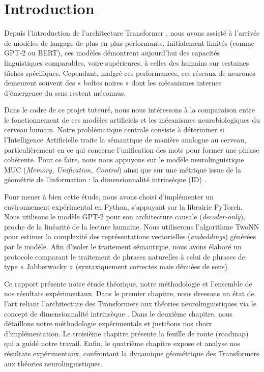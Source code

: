 \chapter*{Introduction}

Depuis l'introduction de l'architecture Transformer \cite{vaswani2017attention}, nous avons assisté à l'arrivée de modèles de langage de plus en plus performants. Initialement limités (comme GPT-2 ou BERT), ces modèles démontrent aujourd'hui des capacités linguistiques comparables, voire supérieures, à celles des humains sur certaines tâches spécifiques. Cependant, malgré ces performances, ces réseaux de neurones demeurent souvent des « boîtes noires » dont les mécanismes internes d'émergence du sens restent méconnus.

Dans le cadre de ce projet tuteuré, nous nous intéressons à la comparaison entre le fonctionnement de ces modèles artificiels et les mécanismes neurobiologiques du cerveau humain. Notre problématique centrale consiste à déterminer si l'Intelligence Artificielle traite la sémantique de manière analogue au cerveau, particulièrement en ce qui concerne l'unification des mots pour former une phrase cohérente. Pour ce faire, nous nous appuyons sur le modèle neurolinguistique MUC (\textit{Memory, Unification, Control}) \cite{hagoort2013memory} ainsi que sur une métrique issue de la géométrie de l'information : la dimensionnalité intrinsèque (ID) \cite{facco2017estimating, ansuini2019intrinsic}.

Pour mener à bien cette étude, nous avons choisi d'implémenter un environnement expérimental en Python, s'appuyant sur la librairie PyTorch. Nous utilisons le modèle GPT-2 pour son architecture causale (\textit{decoder-only}), proche de la linéarité de la lecture humaine. Nous utiliserons l'algorithme TwoNN \cite{facco2017estimating} pour estimer la complexité des représentations vectorielles (\textit{embeddings}) générées par le modèle. Afin d'isoler le traitement sémantique, nous avons élaboré un protocole comparant le traitement de phrases naturelles à celui de phrases de type « Jabberwocky » (syntaxiquement correctes mais dénuées de sens).

Ce rapport présente notre étude théorique, notre méthodologie et l'ensemble de nos résultats expérimentaux. Dans le premier chapitre, nous dressons un état de l'art reliant l'architecture des Transformers aux théories neurolinguistiques via le concept de dimensionnalité intrinsèque \cite{recanatesi2021predictive}. Dans le deuxième chapitre, nous détaillons notre méthodologie expérimentale et justifions nos choix d'implémentation. Le troisième chapitre présente la feuille de route (roadmap) qui a guidé notre travail. Enfin, le quatrième chapitre expose et analyse nos résultats expérimentaux, confrontant la dynamique géométrique des Transformers aux théories neurolinguistiques.
